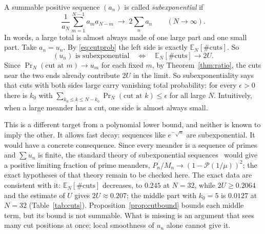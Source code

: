 A summable positive sequence $(a_n)$ is called \emph{subexponential} if
\[ \frac1{a_N}\sum_{m=1}^{N-1}a_ma_{N-m}\;\longrightarrow\;2\sum_na_n \qquad(N\to\infty). \]
In words, a large total is almost always made of one large part and one small part. Take $a_n=u_n$. By
\eqref{eq:cutprob} the left side is exactly $\mathbb E_N[\#\text{cuts}]$. So
\[ (u_n)\text{ is subexponential}\quad\Longleftrightarrow\quad\mathbb E_N[\#\text{cuts}]\to2U . \]
Since $\Pr_N(\text{cut at }m)\to u_m$ for each fixed $m$, by Theorem~\ref{thm:ratio}, the cuts near
the two ends already contribute $2U$ in the limit. So subexponentiality says that cuts with both sides
large carry vanishing total probability: for every $\epsilon>0$ there is $k_0$ with
$\sum_{k_0\le k\le N-k_0}\Pr_N(\text{cut at }k)\le\epsilon$ for all large $N$. Intuitively, when a large
meander has a cut, one side is almost always small.

This is a different target from a polynomial lower bound, and neither is known to imply the other. It
allows fast decay: sequences like $e^{-\sqrt n}$ are subexponential. It would have a concrete consequence. Since every meander is a sequence of primes and
$\sum u_n$ is finite, the standard theory of subexponential sequences~\cite{CNW} would give a positive limiting
fraction of prime meanders, $P_n/M_n\to(1-\mathcal P(1/\mu))^2$; the exact hypotheses of that theory
remain to be checked here. The exact data are consistent with it: $\mathbb E_N[\#\text{cuts}]$
decreases, to $0.245$ at $N=32$, while $2U\ge0.2064$ and the estimate of $U$ gives $2U\approx0.207$;
the middle part with $k_0=5$ is $0.0127$ at $N=32$ (Table~\ref{tab:cuts}). Proposition~\ref{prop:cutbound}
bounds each middle term, but its bound is not summable. What is missing is an argument that sees many
cut positions at once; local smoothness of $u_n$ alone cannot give it.
